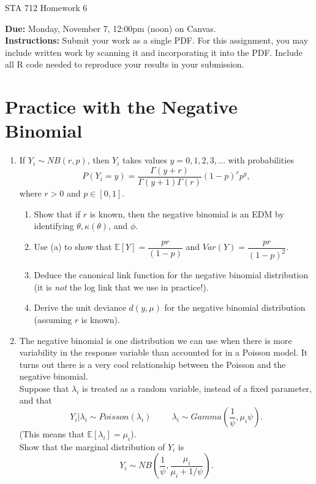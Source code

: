 \documentclass[11pt]{article}
\begin{document}
\begin{center}
\Large
STA 712 Homework 6\\
\normalsize
\vspace{5mm}
\end{center}

\noindent \textbf{Due:} Monday, November 7, 12:00pm (noon) on Canvas.\\ 

\noindent \textbf{Instructions:} Submit your work as a single PDF. For this assignment, you may include written work by scanning it and incorporating it into the PDF. Include all R code needed to reproduce your results in your submission.

\section*{Practice with the Negative Binomial}

\begin{enumerate}
\item If $Y_i \sim NB(r, p)$, then $Y_i$ takes values $y = 0, 1, 2, 3, ...$ with probabilities
$$P(Y_i = y) = \dfrac{\Gamma(y + r)}{\Gamma(y + 1)\Gamma(r)} (1 - p)^r p^y,$$
where $r > 0$ and $p \in [0,1]$.

\begin{enumerate}
\item Show that if $r$ is known, then the negative binomial is an EDM by identifying $\theta, \kappa(\theta)$, and $\phi$.
\item Use (a) to show that $\mathbb{E}[Y] = \dfrac{pr}{(1-p)}$ and $Var(Y) = \dfrac{p r}{(1 - p)^2}$.
\item Deduce the canonical link function for the negative binomial distribution (it is \textit{not} the log link that we use in practice!).
\item Derive the unit deviance $d(y,\mu)$ for the negative binomial distribution (assuming $r$ is known). 
\end{enumerate}

\item The negative binomial is one distribution we can use when there is more variability in the response variable than accounted for in a Poisson model. It turns out there is a very cool relationship between the Poisson and the negative binomial.\\

Suppose that $\lambda_i$ is treated as a random variable, instead of a fixed parameter, and that
$$Y_i | \lambda_i \sim Poisson(\lambda_i) \hspace{1cm} \lambda_i \sim Gamma\left(\dfrac{1}{\psi}, \mu_i \psi\right).$$
(This means that $\mathbb{E}[\lambda_i] = \mu_i$).\\

Show that the marginal distribution of $Y_i$ is 
$$Y_i \sim NB \left( \dfrac{1}{\psi}, \dfrac{\mu_i}{\mu_i + 1/\psi}\right).$$
\end{enumerate}
\end{document}
